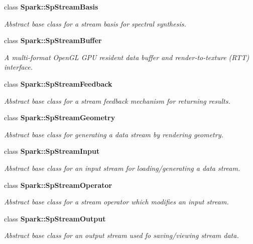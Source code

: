 \begin{CompactItemize}
class {\bf Spark::Sp\-Stream\-Basis}
\begin{CompactList}\small\item\em Abstract base class for a stream basis for spectral synthesis. \item\end{CompactList}\item 
class {\bf Spark::Sp\-Stream\-Buffer}
\begin{CompactList}\small\item\em A multi-format Open\-GL GPU resident data buffer and render-to-texture (RTT) interface. \item\end{CompactList}\item 
class {\bf Spark::Sp\-Stream\-Feedback}
\begin{CompactList}\small\item\em Abstract base class for a stream feedback mechanism for returning results. \item\end{CompactList}\item 
class {\bf Spark::Sp\-Stream\-Geometry}
\begin{CompactList}\small\item\em Abstract base class for generating a data stream by rendering geometry. \item\end{CompactList}\item 
class {\bf Spark::Sp\-Stream\-Input}
\begin{CompactList}\small\item\em Abstract base class for an input stream for loading/generating a data stream. \item\end{CompactList}\item 
class {\bf Spark::Sp\-Stream\-Operator}
\begin{CompactList}\small\item\em Abstract base class for a stream operator which modifies an input stream. \item\end{CompactList}\item 
class {\bf Spark::Sp\-Stream\-Output}
\begin{CompactList}\small\item\em Abstract base class for an output stream used fo saving/viewing stream data. \item\end{CompactList}\item 

\end{CompactItemize}
